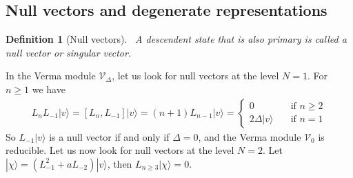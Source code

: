\documentclass[12pt, a4paper]{article}
\theoremstyle{break}
\newtheorem{defn}[exo]{Definition}
\begin{document}
\subsection{Null vectors and degenerate representations}\label{sec:nv}

\begin{defn}[Null vectors]
 ~\label{def:nv}
 A descendent state that is also primary is called a null vector or singular vector.
\end{defn}
In the Verma module $\mathcal V_\Delta$, let us look for null vectors at the level $N=1$. For $n\geq 1$ we have 
\begin{align}
L_n L_{-1}|v\rangle = [L_n, L_{-1}] |v\rangle = (n+1) L_{n-1}|v\rangle = 
\left\{\begin{array}{ll} 0 &  \quad \text{if } n\geq 2 \\ 2\Delta |v\rangle & \quad \text{if } n = 1 \end{array}\right. 
\end{align}
So $L_{-1}|v\rangle$ is a null vector if and only if $\Delta=0$, and the Verma module $\mathcal V_0$ is reducible.
Let us now look for null vectors at the level $N=2$. Let $|\chi\rangle = (L_{-1}^2 + a L_{-2})|v\rangle$, then $L_{n\geq 3} |\chi \rangle =0$. 
\end{document}
